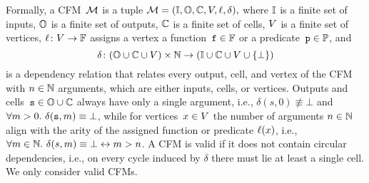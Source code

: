 \noindent Formally, a CFM~$ \mathcal{M} $ is a tuple
$ \mathcal{M} = (\mathbb{I}, \mathbb{O}, \mathbb{C}, V, \ell,
\delta), $ where $ \mathbb{I} $ is a finite set of inputs,
$ \mathbb{O} $ is a finite set of outputs, $ \mathbb{C} $ is a finite set of
cells, $ V $ is a finite set of vertices,
$ \ell \colon V \rightarrow \mathbb{F} $ assigns a
vertex a function~$ {\text{\texttt{f}}} \in \mathbb{F} $ or a
predicate~$ {\text{\texttt{p}}} \in \mathbb{P} $, and
%
\begin{equation*}
  \delta \colon (\mathbb{O} \cup \mathbb{C} \cup V) \times
  \mathbb{N} \rightarrow (\mathbb{I} \cup \mathbb{C} \cup V \cup \{  \bot  \})
\end{equation*}
%
is a dependency relation that relates every output, cell, and
vertex of the CFM with $ n \in \mathbb{N} $ arguments, which are either
inputs, cells, or vertices. Outputs and
cells~$ {\text{\texttt{s}}} \in \mathbb{O} \cup \mathbb{C} $ always have only a single
argument, i.e., $ \delta(s, 0) \not\equiv \bot $ and
\mbox{$ \forall m > 0 .\ \delta({\text{\texttt{s}}}, m) \equiv \bot $}, while for
vertices~$ x \in V $ the number of arguments $ n \in \mathbb{N} $
align with the arity of the assigned function or predicate
$ \ell(x) $, i.e.,
$ \forall m \in \mathbb{N} .\ \delta(s, m) \equiv \bot \leftrightarrow m >
n $. A CFM is valid if it does not contain circular dependencies,
i.e., on every cycle induced by $ \delta $ there must lie at least a
single cell. We only consider valid CFMs.



